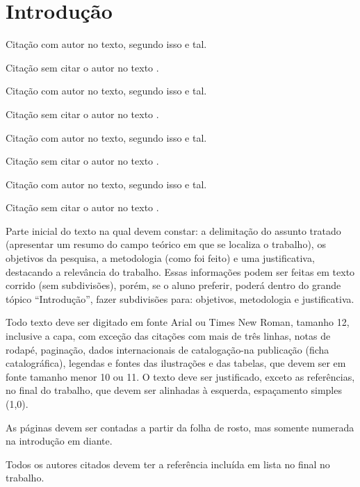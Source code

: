 \chapter{Introdução}

Citação com autor no texto, segundo \textcite{araujo2012} isso e tal.

Citação sem citar o autor no texto \cite{araujo2012}.

Citação com autor no texto, segundo  \textcite{ferreira2018topin} isso e tal.

Citação sem citar o autor no texto \cite{ferreira2018topin}.


Citação com autor no texto, segundo  \textcite{guarino1995} isso e tal.

Citação sem citar o autor no texto \cite{guarino1995}.


Citação com autor no texto, segundo  \textcite{de2023thesis} isso e tal.

Citação sem citar o autor no texto \cite{de2023thesis}.


Parte inicial do texto na qual devem constar: a delimitação do assunto tratado (apresentar um resumo do campo teórico em que se localiza o trabalho), os objetivos da pesquisa, a metodologia (como foi feito) e uma justificativa, destacando a relevância do trabalho. Essas informações podem ser feitas em texto corrido (sem subdivisões), porém, se o aluno preferir, poderá dentro do grande tópico “Introdução”, fazer subdivisões para: objetivos, metodologia e justificativa. 

Todo texto deve ser digitado em fonte Arial ou Times New Roman, tamanho 12, inclusive a capa, com exceção das citações com mais de três linhas, notas de rodapé, paginação, dados internacionais de catalogação-na publicação (ficha catalográfica), legendas e fontes das ilustrações e das tabelas, que devem ser em fonte tamanho menor 10 ou 11. O texto deve ser justificado, exceto as referências, no final do trabalho, que devem ser alinhadas à esquerda, espaçamento simples (1,0). 

As páginas devem ser contadas a partir da folha de rosto, mas somente numerada na introdução em diante. 

Todos os autores citados devem ter a referência incluída em lista no final no trabalho. \cite{de2011associaccao}